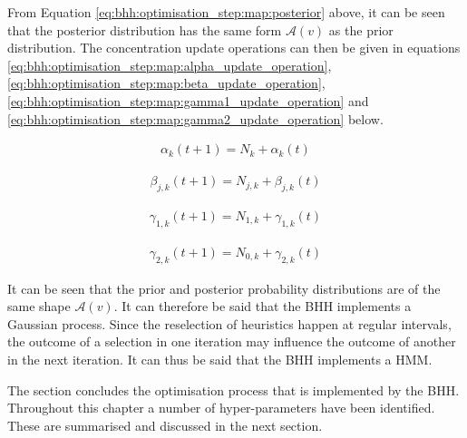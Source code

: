 From Equation \ref{eq:bhh:optimisation_step:map:posterior} above, it can be seen that the posterior distribution has the same form $\mathcal{A}(v)$ as the prior distribution. The concentration update operations can then be given in equations \ref{eq:bhh:optimisation_step:map:alpha_update_operation}, \ref{eq:bhh:optimisation_step:map:beta_update_operation}, \ref{eq:bhh:optimisation_step:map:gamma1_update_operation} and \ref{eq:bhh:optimisation_step:map:gamma2_update_operation} below.

\begin{equation}
    \label{eq:bhh:optimisation_step:map:alpha_update_operation}
    \begin{split}
        \alpha_{k}(t+1) = N_{k} + \alpha_{k}(t)
    \end{split}
\end{equation}

\begin{equation}
    \label{eq:bhh:optimisation_step:map:beta_update_operation}
    \begin{split}
        \beta_{j,k}(t+1) = N_{j,k} + \beta_{j,k}(t)
    \end{split}
\end{equation}

\begin{equation}
    \label{eq:bhh:optimisation_step:map:gamma1_update_operation}
    \begin{split}
        \gamma_{1,k}(t+1) = N_{1,k} + \gamma_{1,k}(t)
    \end{split}
\end{equation}

\begin{equation}
    \label{eq:bhh:optimisation_step:map:gamma2_update_operation}
    \begin{split}
        \gamma_{2,k}(t+1) = N_{0,k} + \gamma_{2,k}(t)
    \end{split}
\end{equation}

It can be seen that the prior and posterior probability distributions are of the same shape $\mathcal{A}(v)$. It can therefore be said that the \ac{BHH} implements a Gaussian process. Since the reselection of heuristics happen at regular intervals, the outcome of a selection in one iteration may influence the outcome of another in the next iteration. It can thus be said that the \ac{BHH} implements a \ac{HMM}.

The section concludes the optimisation process that is implemented by the \ac{BHH}. Throughout this chapter a number of hyper-parameters have been identified. These are summarised and discussed in the next section.


